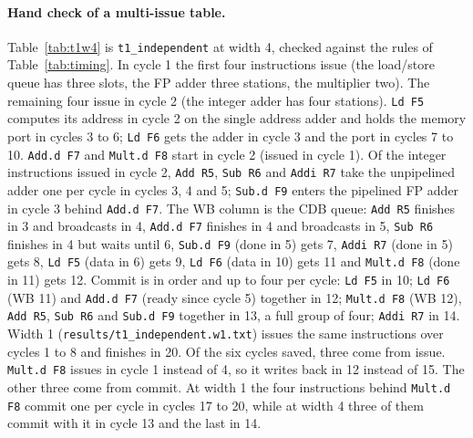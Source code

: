 \documentclass[11pt]{article}
\newcommand{\code}[1]{\texttt{#1}}
\begin{document}
\paragraph{Hand check of a multi-issue table.} Table~\ref{tab:t1w4} is \code{t1\_independent}
at width 4, checked against the rules of Table~\ref{tab:timing}. In cycle 1 the first four
instructions issue (the load/store queue has three slots, the FP adder three stations, the
multiplier two). The remaining four issue in cycle 2 (the integer adder has four stations).
\code{Ld F5} computes its address in cycle 2 on the single address adder and holds the memory
port in cycles 3 to 6; \code{Ld F6} gets the adder in cycle 3 and the port in cycles 7 to 10.
\code{Add.d F7} and \code{Mult.d F8} start in cycle 2 (issued in cycle 1). Of the integer
instructions issued in cycle 2, \code{Add R5}, \code{Sub R6} and \code{Addi R7} take the
unpipelined adder one per cycle in cycles 3, 4 and 5; \code{Sub.d F9} enters the pipelined
FP adder in cycle 3 behind \code{Add.d F7}. The WB column is the CDB queue: \code{Add R5}
finishes in 3 and broadcasts in 4, \code{Add.d F7} finishes in 4 and broadcasts in 5,
\code{Sub R6} finishes in 4 but waits until 6, \code{Sub.d F9} (done in 5) gets 7, \code{Addi R7}
(done in 5) gets 8, \code{Ld F5} (data in 6) gets 9, \code{Ld F6} (data in 10) gets 11 and
\code{Mult.d F8} (done in 11) gets 12. Commit is in order and up to four per cycle:
\code{Ld F5} in 10; \code{Ld F6} (WB 11) and \code{Add.d F7} (ready since cycle 5) together
in 12; \code{Mult.d F8} (WB 12), \code{Add R5}, \code{Sub R6} and \code{Sub.d F9} together in
13, a full group of four; \code{Addi R7} in 14. Width 1
(\code{results/t1\_independent.w1.txt}) issues the same instructions over cycles 1 to 8 and
finishes in 20. Of the six cycles saved, three come from issue. \code{Mult.d F8} issues in
cycle 1 instead of 4, so it writes back in 12 instead of 15. The other three come from
commit. At width 1 the four instructions behind \code{Mult.d F8} commit one per cycle in
cycles 17 to 20, while at width 4 three of them commit with it in cycle 13 and the last in 14.
\end{document}
